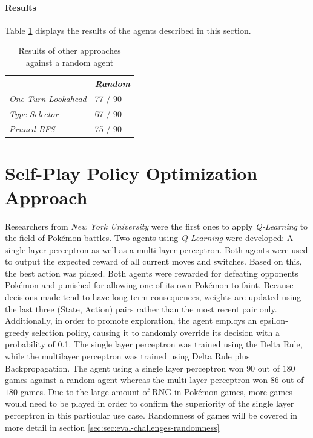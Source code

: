 \paragraph{Results}
Table \ref{tbl:AI-Comp-Results} displays the results of the agents described in this section.
\begin{table}[h]
    \centering
        \begin{tabular}{|l|l|}
            \hline
            & \emph{Random} \\
            \hline
            \emph{One Turn Lookahead} & 77 / 90 \\
            \hline
            \emph{Type Selector} & 67 / 90 \\
            \hline
            \emph{Pruned \ac{BFS}} & 75 / 90 \\
            \hline
        \end{tabular}
        \caption{Results of other approaches against a random agent \cite{Lee_Togelius_2017}}
        \label{tbl:AI-Comp-Results}
\end{table}

\section{Self-Play Policy Optimization Approach}
Researchers from \textit{New York University} \cite{Lee_Togelius_2017} were the first ones to apply
\textit{Q-Learning} to the field of Pokémon battles. Two agents using \textit{Q-Learning}
were developed: A single layer perceptron as well as a multi layer perceptron. Both agents were 
used to output the expected reward of all current moves and switches. Based on this, the best 
action was picked. Both agents were rewarded for defeating opponents Pokémon and punished for 
allowing one of its own Pokémon to faint. Because decisions made tend to have long term consequences, 
weights are updated using the last three (State, Action) pairs rather than the most recent pair only.
Additionally, in order to promote exploration, the agent employs an epsilon-greedy selection policy, 
causing it to randomly override its decision with a probability of 0.1. The single layer perceptron 
was trained using the Delta Rule, while the multilayer perceptron was trained using Delta Rule 
plus Backpropagation. The agent using a single layer perceptron won $90$ out of $180$ games against a
random agent whereas the multi layer perceptron won 86 out of $180$ games. Due to the large amount
of \ac{RNG} in Pokémon games, more games would need to be played in order to confirm the superiority
of the single layer perceptron in this particular use case. Randomness of games will be covered
in more detail in section \ref{sec:sec:eval-challenges-randomness}\\

